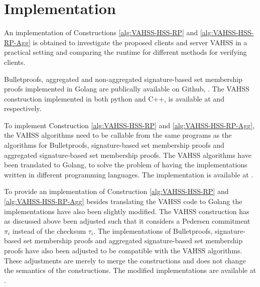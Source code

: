\section{Implementation}
\label{sec:implementation}
An implementation of Constructions \ref{alg:VAHSS-HSS-RP} and \ref{alg:VAHSS-HSS-RP-Agg} is obtained to investigate the proposed clients and server VAHSS in a practical setting and comparing the runtime for different methods for verifying clients.

 

Bulletproofs, aggregated and non-aggregated signature-based set membership proofs implemented in Golang are publically available on Github, \cite{Git:RP} \cite{Git:mycode}. The VAHSS construction implemented in both python and C++,  is available at \cite{Git:python_vahss} and \cite{Git:C_vahss} respectively. 

To implement Construction \ref{alg:VAHSS-HSS-RP} and \ref{alg:VAHSS-HSS-RP-Agg},  the VAHSS algorithms need to be callable from the same programs as the algorithms for Bulletproofs, signature-based set membership proofs and aggregated signature-based set membership proofs. The VAHSS algorithms have been translated to Golang, to solve the problem of having the implementations written in different programming languages. The implementation is available at \cite{Git:mycode}.

To provide an implementation of Construction \ref{alg:VAHSS-HSS-RP} and \ref{alg:VAHSS-HSS-RP-Agg} besides translating the VAHSS code to Golang the implementations have also been slightly modified. The VAHSS construction has as discussed above been adjusted such that it considers a Pedersen commitment $\pi_i$ instead of the checksum $\tau_i$. The implementations of Bulletproofs, signature-based set membership proofs and aggregated signature-based set membership proofs have also been adjusted to be compatible with the VAHSS algorithms. These adjustments are merely to merge the constructions and does not change the semantics of the constructions. The modified implementations are available at \cite{Git:mycode}.


